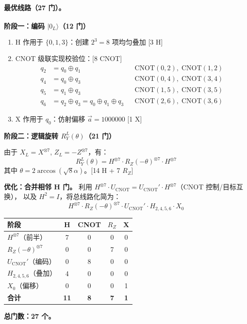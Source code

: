 \documentclass{ctexart}
\begin{document}
\paragraph{最优线路（27 门）。}
\noindent\textbf{阶段一：编码 $|0_L\rangle$（12 门）}
\begin{enumerate}[label=步骤\arabic*.]
    \item H 作用于 $\{0,1,3\}$：创建 $2^3=8$ 项均匀叠加 \hfill[3 H]
    \item CNOT 级联实现校验位：\hfill[8 CNOT]
          \begin{align*}
              q_2 &= q_0 \oplus q_1          &&\text{CNOT}(0,2),\;\text{CNOT}(1,2) \\
              q_4 &= q_0 \oplus q_3          &&\text{CNOT}(0,4),\;\text{CNOT}(3,4) \\
              q_5 &= q_1 \oplus q_3          &&\text{CNOT}(1,5),\;\text{CNOT}(3,5) \\
              q_6 &= q_2 \oplus q_3 = q_0 \oplus q_1 \oplus q_3 &&\text{CNOT}(2,6),\;\text{CNOT}(3,6)
          \end{align*}
    \item X 作用于 $q_0$：仿射偏移 $\vec{a}=1000000$ \hfill[1 X]
\end{enumerate}

\noindent\textbf{阶段二：逻辑旋转 $R_Y^L(\theta)$（21 门）}

由于 $X_L = X^{\otimes 7}$, $Z_L = -Z^{\otimes 7}$，有：
\begin{equation*}
    R_Y^L(\theta) = H^{\otimes 7} \cdot R_Z(-\theta)^{\otimes 7} \cdot H^{\otimes 7}
\end{equation*}
其中 $\theta = 2\arccos(\sqrt{8}\alpha)$。\hfill[14 H + 7 $R_Z$]

\noindent\textbf{优化：合并相邻 H 门。}
利用 $H^{\otimes 7} \cdot U_{\text{CNOT}} = U_{\text{CNOT}}' \cdot H^{\otimes 7}$（CNOT 控制/目标互换），
以及 $H^2 = I$，将总线路化简为：
\begin{equation*}
    \boxed{H^{\otimes 7} \cdot R_Z(-\theta)^{\otimes 7} \cdot U_{\text{CNOT}}' \cdot H_{2,4,5,6} \cdot X_0}
\end{equation*}

\begin{table}[H]
\centering
\begin{tabular}{lcccc}
\toprule
\textbf{阶段} & \textbf{H} & \textbf{CNOT} & \textbf{$R_Z$} & \textbf{X} \\
\midrule
$H^{\otimes 7}$（前半） & 7 & 0 & 0 & 0 \\
$R_Z(-\theta)^{\otimes 7}$ & 0 & 0 & 7 & 0 \\
$U_{\text{CNOT}}'$（编码） & 0 & 8 & 0 & 0 \\
$H_{2,4,5,6}$（叠加） & 4 & 0 & 0 & 0 \\
$X_0$（偏移） & 0 & 0 & 0 & 1 \\
\midrule
\textbf{合计} & \textbf{11} & \textbf{8} & \textbf{7} & \textbf{1} \\
\bottomrule
\end{tabular}
\end{table}
\textbf{总门数：27 个。}
\end{document}
